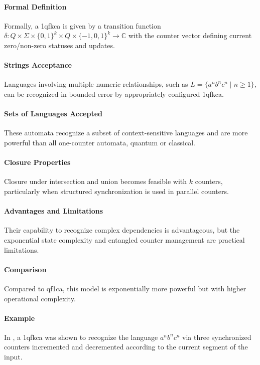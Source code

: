 \paragraph{Formal Definition}
Formally, a \gls{1qfkca} is given by a transition function $\delta: Q \times \Sigma \times \{0,1\}^k \times Q \times \{-1,0,1\}^k \rightarrow \mathbb{C}$ with the counter vector defining current zero/non-zero statuses and updates.

\paragraph{Strings Acceptance}
Languages involving multiple numeric relationships, such as $L = \{ a^n b^n c^n \mid n \geq 1 \}$, can be recognized in bounded error by appropriately configured \gls{1qfkca}.

\paragraph{Sets of Languages Accepted}
These automata recognize a subset of context-sensitive languages and are more powerful than all one-counter automata, quantum or classical.

\paragraph{Closure Properties}
Closure under intersection and union becomes feasible with $k$ counters, particularly when structured synchronization is used in parallel counters.

\paragraph{Advantages and Limitations}
Their capability to recognize complex dependencies is advantageous, but the exponential state complexity and entangled counter management are practical limitations.

\paragraph{Comparison}
Compared to \gls{qf1ca}, this model is exponentially more powerful but with higher operational complexity.

\paragraph{Example}
In \cite{cem2012quantum}, a \gls{1qfkca} was shown to recognize the language $a^n b^n c^n$ via three synchronized counters incremented and decremented according to the current segment of the input.


